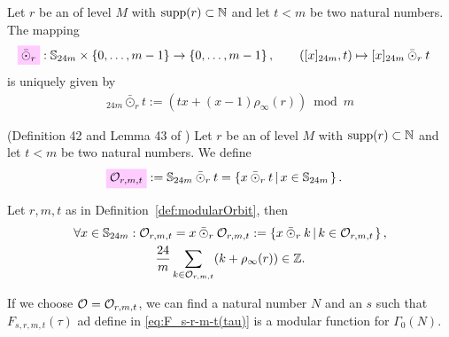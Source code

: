 \documentclass{article}
\begin{document}
\begin{Definition}\cite[Def.~41]{Radu_RamanujanKolberg_2015}
  Let $r$ be an  of level $M$ with
  $\operatorname{supp}(r) \subset \mathbb{N}$ and let $t<m$ be two natural numbers.
  The mapping
  \begin{align*}
    \defineNotation[odotbar-r]{\bar{\odot}_r}
    &: \setS_{24m} \times \Set{0,\ldots,m-1} \to \Set{0,\ldots,m-1},
    \qquad
    ([x]_{24m}, t) \mapsto [x]_{24m}  \mathbin{\bar{\odot}_r} t
  \end{align*}
  is uniquely given by
  \begin{gather}
    [x]_{24m} \mathbin{\bar{\odot}_r} t
    :=
    \left( t x + (x-1) \rho_\infty(r) \right) \bmod{m}
  \end{gather}
\end{Definition}

\begin{Definition}
  \label{def:modularOrbit}
  (Definition 42 and Lemma 43 of \cite{Radu_RamanujanKolberg_2015})
  Let $r$ be an  of level $M$ with
  $\operatorname{supp}(r) \subset \mathbb{N}$ and let $t<m$ be two natural numbers.
%
  We define
  \begin{align}
    \defineNotation[O-r-m-t]{\modularOrbit{r,m,t}}
    &:=
      \setS_{24m}  \mathbin{\bar{\odot}_r} t
      =
      \SetDef{x \mathbin{\bar{\odot}_r} t}{x \in \setS_{24m}}.
  \end{align}
\end{Definition}

\begin{Lemma}
  \label{thm:orbit-sum}
  \cite[Lemma~43]{Radu_RamanujanKolberg_2015}
  Let $r,m,t$ as in Definition~\ref{def:modularOrbit}, then
  \begin{gather}
  \forall x \in \setS_{24m}:
  \modularOrbit{r,m,t}
    = x \mathbin{\bar{\odot}_r} \modularOrbit{r,m,t}
    := \SetDef{x \mathbin{\bar{\odot}_r} k}{k\in \modularOrbit{r,m,t}},
    \\
    \frac{24}{m}\sum_{k \in \modularOrbit{r,m,t}} (k + \rho_\infty(r)) \in \setZ.
    \label{eq:orbit-rum}
  \end{gather}
\end{Lemma}

If we choose $\mathcal{O}_{} = \mathcal{O}_{r,m,t}$, we can find a
natural number $N$ and an  $s$ such that
$F_{s,r,m,t}(\tau)$ ad define in \eqref{eq:F_s-r-m-t(tau)} is a
modular function for $\Gamma_0(N)$.
\end{document}
